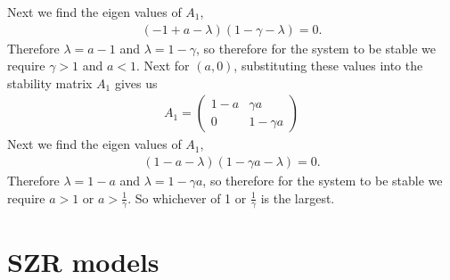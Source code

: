 \documentclass{mm2}
\numberwithin{equation}{section}
\theoremstyle{definition}
\begin{document}
Next we find the eigen values of $A_1$, 
\begin{eqnarray}
(-1 + a- \lambda)(1 - \gamma - \lambda)=0.
\end{eqnarray}
Therefore $\lambda = a-1$ and $\lambda = 1- \gamma$, so therefore for the system to be stable we require $\gamma > 1$ and $a<1$.
Next for $(a,0)$, substituting these values into the stability matrix $A_1$ gives us
\begin{eqnarray}
A_1 = \begin{pmatrix}
1 - a & \gamma a \\
0 & 1 - \gamma a
\end{pmatrix}
\end{eqnarray} 
Next we find the eigen values of $A_1$, 
\begin{eqnarray}
(1 - a- \lambda)(1 - \gamma a - \lambda)=0.
\end{eqnarray}
Therefore $\lambda = 1- a$ and $\lambda = 1- \gamma a $, so therefore for the system to be stable we require $a>1$ or $a>\frac{1}{\gamma}$. So whichever of 1 or $\frac{1}{\gamma}$ is the largest.\cite{Prior}\newline
\section{SZR models}
\end{document}
